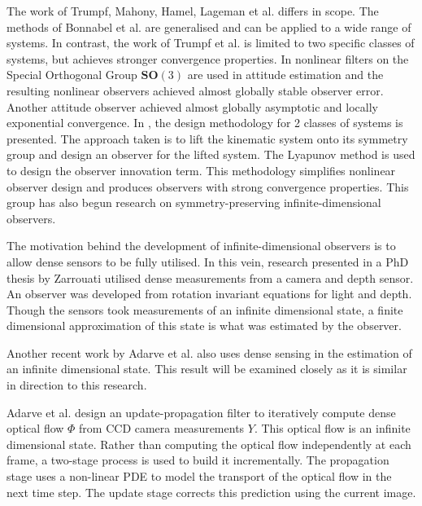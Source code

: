 The work of Trumpf, Mahony, Hamel, Lageman et al. differs in scope. The methods of Bonnabel et al. are generalised and can be applied to a wide range of systems. In contrast, the work of Trumpf et al. is limited to two specific classes of systems, but achieves stronger convergence properties.
In \cite{mahony2009nonlinear} nonlinear filters on the Special Orthogonal Group $\mathbf{SO}(3)$ are used in attitude estimation and the resulting nonlinear observers achieved almost globally stable observer error.
Another attitude observer \cite{trumpf2012analysis} achieved almost globally asymptotic and locally exponential convergence.
In \cite{mahony2013observers}, the design methodology for 2 classes of systems is presented. The approach taken is to lift the kinematic system onto its symmetry group and design an observer for the lifted system. The Lyapunov method is used to design the observer innovation term. This methodology simplifies nonlinear observer design and produces observers with strong convergence properties. This group has also begun research  on symmetry-preserving infinite-dimensional observers.

The motivation behind the development of infinite-dimensional observers is to allow dense sensors to be fully utilised. In this vein, research presented in a PhD thesis by Zarrouati \cite{zarrouati2013augmented} utilised dense measurements from a camera and depth sensor. An observer was developed from rotation invariant equations for light and depth. Though the sensors took measurements of an infinite dimensional state, a finite dimensional approximation of this state is what was estimated by the observer.

Another recent work by Adarve et al.\cite{adarvefiltering} also uses dense sensing in the estimation of an infinite dimensional state. This result will be examined closely as it is similar in direction to this research.

Adarve et al. design an update-propagation filter to iteratively compute dense optical flow $\Phi$ from CCD camera measurements $Y$. This optical flow is an infinite dimensional state. Rather than computing the optical flow independently at each frame, a two-stage process is used to build it incrementally. The propagation stage uses a non-linear PDE to model the transport of the optical flow in the next time step. The update stage corrects this prediction using the current image.

